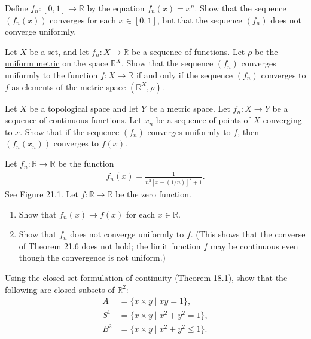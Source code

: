   \begin{exercise}[Munkres 21.6]
    Define $f_n : [0, 1] \to \mathbb{R}$ by the equation $f_n(x) = x^n$. Show that the sequence $(f_n(x))$ converges for each $x \in [0, 1]$, but that the sequence $(f_n)$ does not converge uniformly.
  \end{exercise}

  \begin{exercise}[Munkres 21.7]
    Let $X$ be a set, and let $f_n : X \to \mathbb{R}$ be a sequence of functions. Let $\bar{\rho}$ be the \hyperref[def:uniform-metric]{uniform metric} on the space $\mathbb{R}^X$. Show that the sequence $(f_n)$ converges uniformly to the function $f : X \to \mathbb{R}$ if and only if the sequence $(f_n)$ converges to $f$ as elements of the metric space $(\mathbb{R}^X, \bar{\rho})$.
  \end{exercise}

  \begin{exercise}[Munkres 21.8]
    Let $X$ be a topological space and let $Y$ be a metric space. Let $f_n : X \to Y$ be a sequence of \hyperref[def:continuous_func]{continuous functions}. Let $x_n$ be a sequence of points of $X$ converging to $x$. Show that if the sequence $(f_n)$ converges uniformly to $f$, then $(f_n(x_n))$ converges to $f(x)$.
  \end{exercise}

  \begin{exercise}[Munkres 21.9]
    Let $f_n : \mathbb{R} \to \mathbb{R}$ be the function
    \begin{align*}
      f_n(x) = \frac{1}{n^3[x - (1/n)]^2 + 1}.
    \end{align*}
    See Figure 21.1. Let $f : \mathbb{R} \to \mathbb{R}$ be the zero function.
    \begin{enumerate} 
      \item[(a)] Show that $f_n(x) \to f(x)$ for each $x \in \mathbb{R}$.
      \item[(b)] Show that $f_n$ does not converge uniformly to $f$. (This shows that the converse of Theorem 21.6 does not hold; the limit function $f$ may be continuous even though the convergence is not uniform.)
    \end{enumerate}
  \end{exercise}

  \begin{exercise}[Munkres 21.10]
    Using the \hyperref[def:closed]{closed set} formulation of continuity (Theorem 18.1), show that the following are closed subsets of $\mathbb{R}^2$:
    \begin{align*}
      A &= \{x \times y \mid xy = 1\}, \\
      S^1 &= \{x \times y \mid x^2 + y^2 = 1\}, \\
      B^2 &= \{x \times y \mid x^2 + y^2 \leq 1\}.
    \end{align*}
  \end{exercise}

